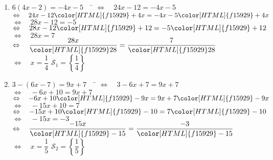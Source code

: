 \documentclass[a4paper,11pt,exos]{nsi} %
\begin{document}
\begin{enumerate}
    \item 	\begin{tabbing}
        $ 6(4x-2)=-4x-5 \quad$		\=	$\Leftrightarrow\quad 24x-12=-4x-5 $\\
        \>	$\Leftrightarrow\quad   24x-12{\color[HTML]{f15929}+4x}=-4x-5{\color[HTML]{f15929}+4x} $\\
        \>	$\Leftrightarrow\quad   28x-12=-5 $\\
        \>	$\Leftrightarrow\quad   28x-12{\color[HTML]{f15929}+12}=-5{\color[HTML]{f15929}+12} $\\
        \>	$\Leftrightarrow\quad   28x=7 $\\
        \>	$\Leftrightarrow\quad   \dfrac{28x}{\color[HTML]{f15929}28}=\dfrac{7}{\color[HTML]{f15929}28} $\\
        \>	$\Leftrightarrow\quad	x=\dfrac{1}{4} $ \hspace{4cm} $\mathcal{S}_1=\left\{ \dfrac{1}{4} \right\}$
    \end{tabbing}

    \item 	\begin{tabbing}
        $ 3-(6x-7)=9x+7 \quad$		\=	$\Leftrightarrow\quad 3-6x+7=9x+7 $\\
        \>	$\Leftrightarrow\quad   -6x+10=9x+7 $\\
        \>	$\Leftrightarrow\quad   -6x+10{\color[HTML]{f15929}-9x}=9x+7{\color[HTML]{f15929}-9x} $\\
        \>	$\Leftrightarrow\quad   -15x+10=7 $\\
        \>	$\Leftrightarrow\quad   -15x+10{\color[HTML]{f15929}-10}=7{\color[HTML]{f15929}-10} $\\
        \>	$\Leftrightarrow\quad   -15x=-3 $\\
        \>	$\Leftrightarrow\quad   \dfrac{-15x}{\color[HTML]{f15929}-15}=\dfrac{-3}{\color[HTML]{f15929}-15} $\\
        \>	$\Leftrightarrow\quad	x=\dfrac{1}{5} $ \hspace{4cm} $\mathcal{S}_2=\left\{ \dfrac{1}{5} \right\}$
    \end{tabbing}	


\end{enumerate}
\end{document}
